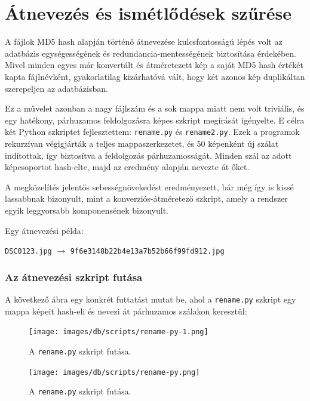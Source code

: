 \documentclass[	
  noindent
]{elteikthesis}[2024/04/26]
\begin{document}
  \section{Átnevezés és ismétlődések szűrése}
    A fájlok MD5 hash alapján történő átnevezése kulcsfontosságú lépés volt az adatbázis egységességének és redundancia-mentességének biztosítása érdekében. Mivel minden egyes már konvertált és átméretezett kép a saját MD5 hash értékét kapta fájlnévként, gyakorlatilag kizárhatóvá vált, hogy két azonos kép duplikáltan szerepeljen az adatbázisban.
    
    Ez a művelet azonban a nagy fájlszám és a sok mappa miatt nem volt triviális, és egy hatékony, párhuzamos feldolgozásra képes szkript megírását igényelte. E célra két Python szkriptet fejlesztettem: \texttt{rename.py} és \texttt{rename2.py}. Ezek a programok rekurzívan végigjárták a teljes mappaszerkezetet, és 50 képenként új szálat indítottak, így biztosítva a feldolgozás párhuzamosságát. Minden szál az adott képcsoportot hash-elte, majd az eredmény alapján nevezte át őket.
    
    A megközelítés jelentős sebességnövekedést eredményezett, bár még így is kissé lassabbnak bizonyult, mint a konverziós-átméretező szkript, amely a rendszer egyik leggyorsabb komponensének bizonyult.
    
    Egy átnevezési példa:
    
    \begin{center}
    \texttt{DSC0123.jpg} $\rightarrow$ \texttt{9f6e3148b22b4e13a7b52b66f99fd912.jpg}
    \end{center}
  
  \subsubsection{Az átnevezési szkript futása}
  
  A következő ábra egy konkrét futtatást mutat be, ahol a \texttt{rename.py} szkript egy mappa képeit hash-eli és nevezi át párhuzamos szálakon keresztül:

  \begin{figure}[H]
    \centering
    \texttt{[image: images/db/scripts/rename-py-1.png]}
    \caption{A \texttt{rename.py} szkript futása.}
    \label{fig:02-rename.py}
  \end{figure}

  \begin{figure}[H]
      \centering
      \texttt{[image: images/db/scripts/rename-py.png]}
      \caption{A \texttt{rename.py} szkript futása.}
      \label{fig:02-rename.py}
  \end{figure}
  
\end{document}
